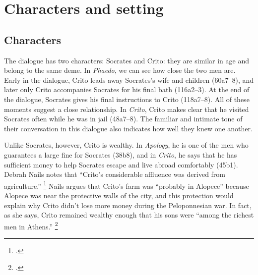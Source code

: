 \documentclass[12pt,letterpaper]{article}
\newcommand{\MONTH}{%
  \ifcase\the\month\
  \or\ January%
  \or\ February%
  \or\ March%
  \or\ April%
  \or\ May%
  \or\ June%
  \or\ July%
  \or\ August%
  \or\ September%
  \or\ October%
  \or\ November%
  \or\ December%
  \fi}
\begin{document}

\pagestyle{notes}

\section*{Characters and setting}

\subsection*{Characters}

The dialogue has two characters: Socrates and Crito: they are similar in age and belong to the same deme.
 In \textit{Phaedo}, we can see how close the two men are.
Early in the dialogue, Crito leads away Socrates's wife and children (60a7--8), and later only Crito accompanies Socrates for his final bath (116a2--3).
At the end of the dialogue, Socrates gives his final instructions to Crito (118a7--8).
All of these moments suggest a close relationship.
In \textit{Crito}, Crito makes clear that he visited Socrates often while he was in jail (48a7--8).
The familiar and intimate tone of their conversation in this dialogue also indicates how well they knew one another.

Unlike Socrates, however, Crito is wealthy.
In \textit{Apology}, he is one of the men who guarantees a large fine for Socrates (38b8), and in \textit{Crito}, he says that he has sufficient money to help Socrates escape and live abroad comfortably (45b1).
Debrah Nails notes that ``Crito's considerable affluence was derived from agriculture.''%
\footcite[][115.
She cites \textit{Euthydemus} 291e, Xenophon's \textit{Memorabilia} 2.9.4, and Diogenes Laertius 2.31.]{nails2002-people-of-plato}
Nails argues that Crito's farm was ``probably in Alopece'' because Alopece was near the protective walls of the city, and this protection would explain why Crito didn't lose more money during the Peloponnesian war.
In fact, as she says, Crito remained wealthy enough that his sons were ``among the richest men in Athens.''%
\footcite[][115]{nails2002-people-of-plato}
\end{document}
